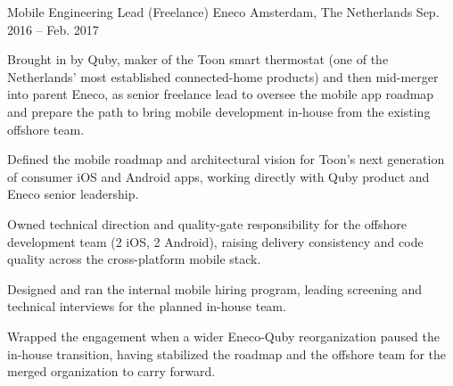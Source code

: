 \begin{cventries}
  \cventry
    {Mobile Engineering Lead (Freelance)} %
    {Eneco} %
    {Amsterdam, The Netherlands} %
    {Sep. 2016 -- Feb. 2017} %
    {
      \begin{cvitems} %
        \item {Brought in by Quby, maker of the Toon smart thermostat (one of the Netherlands' most established connected-home products) and then mid-merger into parent Eneco, as senior freelance lead to oversee the mobile app roadmap and prepare the path to bring mobile development in-house from the existing offshore team.}
        \item {Defined the mobile roadmap and architectural vision for Toon's next generation of consumer iOS and Android apps, working directly with Quby product and Eneco senior leadership.}
        \item {Owned technical direction and quality-gate responsibility for the offshore development team (2 iOS, 2 Android), raising delivery consistency and code quality across the cross-platform mobile stack.}
        \item {Designed and ran the internal mobile hiring program, leading screening and technical interviews for the planned in-house team.}
        \item {Wrapped the engagement when a wider Eneco-Quby reorganization paused the in-house transition, having stabilized the roadmap and the offshore team for the merged organization to carry forward.}
      \end{cvitems}
    }


\end{cventries}
